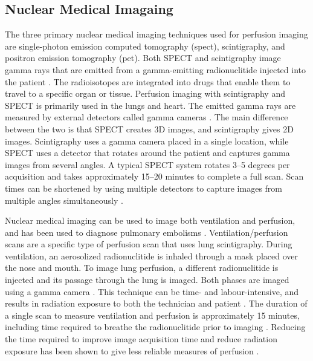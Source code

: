 \subsection{Nuclear Medical Imagaing}
The three primary nuclear medical imaging techniques used for perfusion imaging are 
single-photon emission computed tomography (\acrshort{spect}), scintigraphy, 
and positron emission tomography (\acrshort{pet}). 
Both SPECT and scintigraphy image gamma rays that are emitted from a gamma-emitting radionuclitide
injected into the patient \parencite{mettler_essentials_2006}. 
The radioisotopes are integrated into drugs 
that enable them to travel to a specific organ or tissue. 
Perfusion imaging with scintigraphy and SPECT 
is primarily used in the lungs and heart. 
The emitted gamma rays are measured by external detectors called 
gamma cameras \parencite{mettler_essentials_2006}. 
The main difference between the two is that SPECT creates 3D images, and 
scintigraphy gives 2D images.
Scintigraphy uses a gamma camera placed in a single location, while SPECT 
uses a detector that rotates around the patient and captures gamma images from 
several angles. A typical SPECT system rotates 3--5 degrees per acquisition 
and takes approximately 15--20 minutes to complete a full scan. 
Scan times can be shortened by using
multiple detectors to capture
images from multiple angles simultaneously \parencite{mettler_essentials_2006}.

Nuclear medical imaging can be used to image both ventilation and perfusion, and
has been used to diagnose pulmonary embolisms \parencite{mortensen_lung_2019}.
Ventilation/perfusion scans are a specific type of perfusion scan that uses lung
scintigraphy. During ventilation, an aerosolized radionuclitide is inhaled through a mask placed
over the nose and mouth. To image lung perfusion, a different radionuclitide 
is injected and its passage through 
the lung is imaged.
Both phases are imaged using a gamma camera \parencite{mortensen_lung_2019}. 
This technique can be time- and labour-intensive, and results in 
radiation exposure to both the technician and patient \parencite{gandev_comparison_2005}.
The duration of a single scan to measure ventilation and  
perfusion is approximately 15 minutes, including time required to breathe the radionuclitide
prior to imaging \parencite{hur_optimizing_2014}. Reducing the time 
required to improve image acquisition time and reduce radiation exposure
has been shown to give less reliable measures of perfusion \parencite{hur_optimizing_2014}.

